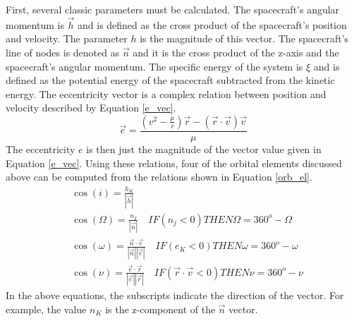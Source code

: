 First, several classic parameters must be calculated.  The spacecraft's angular
momentum is $\vec{h}$ and is defined as the cross product of the spacecraft's
position and velocity.  The parameter $h$ is the magnitude of this vector.
The spacecraft's line of nodes is denoted as $\vec{n}$ and it is the cross
product of the z-axis and the spacecraft's angular momentum.  The specific
energy of the system is $\xi$ and is defined as the potential energy of the
spacecraft subtracted from the kinetic energy.  The eccentricity vector is a
complex relation between position and velocity described by Equation
\ref{e_vec}.
\begin{equation}
\vec{e}=\frac{(v^2-\frac{\mu}{r})\vec{r}-(\vec{r}\cdot \vec{v})\vec{v}}{\mu}
\label{e_vec}
\end{equation}
The eccentricity $e$ is then just the magnitude of the vector value given in
Equation \ref{e_vec}.  Using these relations, four of the orbital elements
discussed above can be computed from the relations shown in Equation
\ref{orb_el}.
\begin{equation}
\begin{split}
&\cos(i) = \frac{h_K}{|\vec{h}|}\\
&\cos(\Omega) = \frac{n_I}{|\vec{n}|}
    \quad IF(n_j < 0) THEN \Omega = 360^o-\Omega\\
&\cos(\omega) = \frac{\vec{n}\cdot\vec{e}}{|\vec{n}||\vec{e}|}
    \quad IF(e_K<0) THEN \omega = 360^o-\omega\\
&\cos(\nu) = \frac{\vec{e}\cdot\vec{r}}{|\vec{e}||\vec{r}|}
    \quad IF(\vec{r}\cdot\vec{v}<0) THEN \nu = 360^o-\nu
\end{split}
\label{orb_el}
\end{equation}
In the above equations,
the subscripts indicate the direction of the vector.  For example, the value
$n_K$ is the z-component of the $\vec{n}$ vector.


